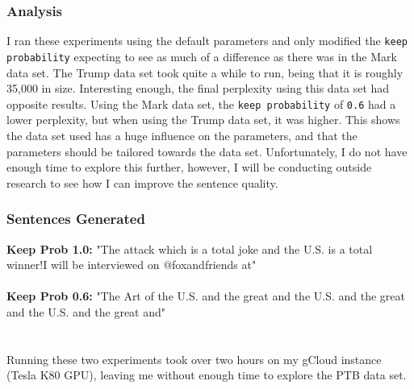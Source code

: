 \documentclass[a4paper]{article}
\begin{document}
\subsubsection{Analysis}
 I ran these experiments using the default parameters and only modified the \texttt{keep probability} expecting to see as much of a difference as there was in the Mark data set. The Trump data set took quite a while to run, being that it is roughly 35,000 in size. Interesting enough, the final perplexity using this data set had opposite results. Using the Mark data set, the \texttt{keep probability} of \texttt{0.6} had a lower perplexity, but when using the Trump data set, it was higher. This shows the data set used has a huge influence on the parameters, and that the parameters should be tailored towards the data set. Unfortunately, I do not have enough time to explore this further, however, I will be conducting outside research to see how I can improve the sentence quality.

\subsubsection{Sentences Generated}
\textbf{Keep Prob 1.0:} "The attack which is a total joke and the U.S. is a total winner!I will be interviewed on @foxandfriends at"
\\\\
\textbf{Keep Prob 0.6:} "The Art of the U.S. and the great and the U.S. and the great and the U.S. and the great and"
\\\\\\
 Running these two experiments took over two hours on my gCloud instance (Tesla K80 GPU), leaving me without enough time to explore the PTB data set. \Frowny{}
\end{document}
